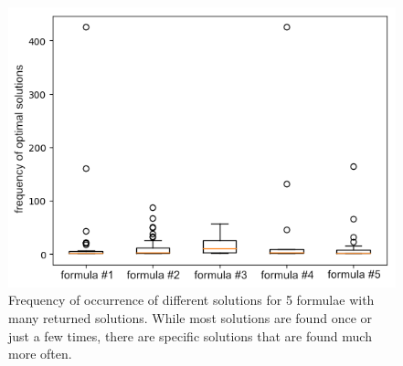 \begin{figure}
\centering
\includegraphics[width=.8\textwidth]{../material_2/25_clauses__4_2_def_MISBIAS.png}
\caption{Frequency of occurrence of different solutions for 5 formulae with many returned solutions. While most solutions are found once or just a few times, there are specific solutions that are found much more often.} \label{fig:distr-sols}
\end{figure}



